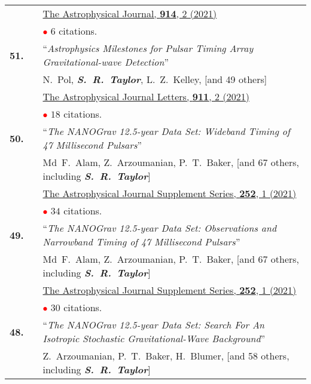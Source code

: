 \documentclass[11pt,letterpaper,sans]{moderncv}
\begin{document}
{\begin{longtable}{rp{0.3cm}p{15.8cm}}
&& \href{https://ui.adsabs.harvard.edu/link_gateway/2021ApJ...914..121A/doi:10.3847/1538-4357/abfcd3}{{\color{color1} The Astrophysical Journal, \textbf{914}, 2 (2021)}}  \vspace{0.09cm}\\
&& \textcolor{red}{$\bullet$} $6$ citations. \vspace{0.09cm}\\
\textbf{51.} & & ``\textit{Astrophysics Milestones for Pulsar Timing Array Gravitational-wave Detection}'' \\ 
&&N.~Pol, \textit{\textbf{S.~R.~Taylor}}, L.~Z.~Kelley, [and 49 others] \\
&& \href{}{{\color{color1} The Astrophysical Journal Letters, \textbf{911}, 2 (2021)}} \\
&& \textcolor{red}{$\bullet$} $18$ citations. \vspace{0.09cm}\\
\textbf{50.} & & ``\textit{The NANOGrav 12.5-year Data Set: Wideband Timing of 47 Millisecond Pulsars}'' \\ 
&&Md~F.~Alam, Z.~Arzoumanian, P.~T.~Baker, [and 67 others, including \textit{\textbf{S.~R.~Taylor}}] \\
&& \href{https://ui.adsabs.harvard.edu/link_gateway/2021ApJS..252....5A/doi:10.3847/1538-4365/abc6a1}{{\color{color1} The Astrophysical Journal Supplement Series, \textbf{252}, 1 (2021)}} \\
&& \textcolor{red}{$\bullet$} $34$ citations. \vspace{0.09cm}\\
\textbf{49.} & & ``\textit{The NANOGrav 12.5-year Data Set: Observations and Narrowband Timing of 47 Millisecond Pulsars}'' \\ 
&&Md~F.~Alam, Z.~Arzoumanian, P.~T.~Baker, [and 67 others, including \textit{\textbf{S.~R.~Taylor}}] \\
&& \href{https://ui.adsabs.harvard.edu/link_gateway/2021ApJS..252....4A/doi:10.3847/1538-4365/abc6a0}{{\color{color1} The Astrophysical Journal Supplement Series, \textbf{252}, 1 (2021)}} \\
&& \textcolor{red}{$\bullet$} $30$ citations. \vspace{0.09cm}\\
\textbf{48.} & & ``\textit{The NANOGrav 12.5-year Data Set: Search For An Isotropic Stochastic Gravitational-Wave Background}'' \\ 
&&Z.~Arzoumanian, P.~T.~Baker, H.~Blumer, [and 58 others, including \textit{\textbf{S.~R.~Taylor}}] \\

\end{longtable}}
\end{document}
